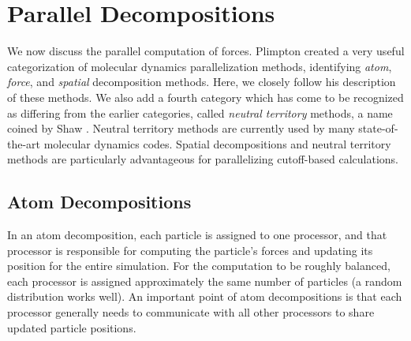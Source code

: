 \section{Parallel Decompositions}

We now discuss the parallel computation of forces.  Plimpton
\cite{plimpton} created a very useful categorization of molecular dynamics
parallelization methods, identifying {\em atom}, {\em force}, and {\em spatial} 
decomposition
methods.  Here, we closely follow his description of these methods.
We also add a fourth category which has come to be recognized as
differing from the earlier categories, called {\em neutral territory} methods,
a name coined by Shaw \cite{shaw}.  Neutral territory methods are currently
used by many state-of-the-art molecular dynamics codes.
Spatial decompositions and neutral territory methods are particularly
advantageous for parallelizing cutoff-based calculations.

\subsection{Atom Decompositions}

In an atom decomposition, each particle is assigned to one processor,
and that processor is responsible for computing the particle's forces and
updating its position for the entire simulation.  For the computation
to be roughly balanced, each processor is assigned approximately the same
number of particles (a random distribution works well).  An important point
of atom decompositions is that each
processor generally needs to communicate with all other processors to
share updated particle positions.

